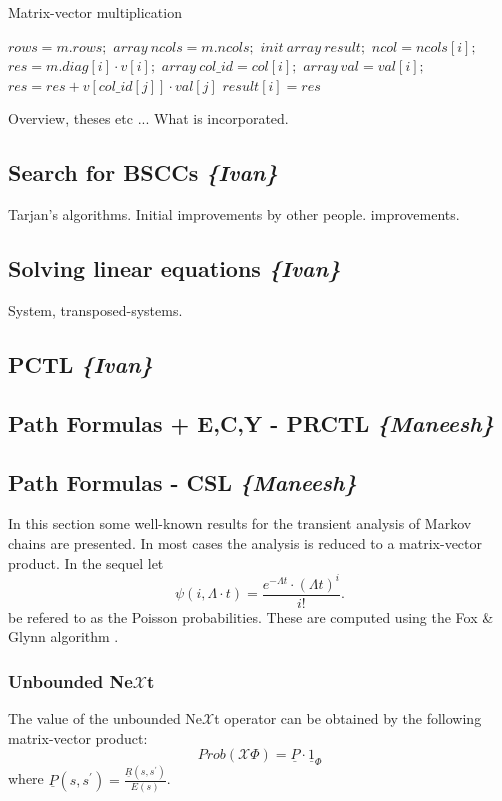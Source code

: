 \documentclass[a4paper,10pt]{article}
\begin{document}
	\begin{algorithm}
	\caption{Matrix-vector multiplication}
	\label{alg:mvm}
	\begin{algorithmic}[1]
		\STATE $rows=m.rows;$ $array\ ncols=m.ncols;$ $init\ array\ result;$
			\STATE $ncol=ncols[i];$ $res=m.diag[i]\cdot v[i];$
				\STATE $array\ col\_id=col[i];$ $array\ val=val[i];$
					\STATE $res=res+v[col\_id[j]]\cdot val[j]$
				\ENDFOR
			\ENDIF
			\STATE $result[i]=res$
		\ENDFOR
	\ENDPROC
	\end{algorithmic}
	\end{algorithm}
	
	Overview, theses etc ... What is incorporated.

\subsection{Search for BSCCs \textit{\{Ivan\}}}
	Tarjan's algorithms. Initial improvements by other people.
	improvements.

\subsection{Solving linear equations \textit{\{Ivan\}}}
	System, transposed-systems.
	
\subsection{PCTL \textit{\{Ivan\}}}
\subsection{Path Formulas + E,C,Y - PRCTL \textit{\{Maneesh\}}}
\subsection{Path Formulas - CSL \textit{\{Maneesh\}}}
In this section some well-known results for the transient analysis of Markov chains are presented. In most cases
the analysis is reduced to a matrix-vector product. In the sequel let
\begin{equation*}
\psi(i, \Lambda\cdot t) = \frac{e^{-\Lambda t}\cdot(\Lambda t)^{i}}{i!}.
\end{equation*}
be refered to as the Poisson probabilities. These are computed using the Fox \& Glynn algorithm \cite{fox1}.
	\subsubsection{Unbounded Ne$\mathcal{X}$t}
	The value of the unbounded Ne$\mathcal{X}$t operator can be obtained by the following matrix-vector product:
	\begin{equation*}
		Prob(\mathcal{X}\Phi) = \underline{P} \cdot \underline{1}_{\Phi}
	\end{equation*}
	where $\underline{P}(s,s^{\prime})=\frac{\underline{R}(s,s^{\prime})}{E(s)}$.
\end{document}
